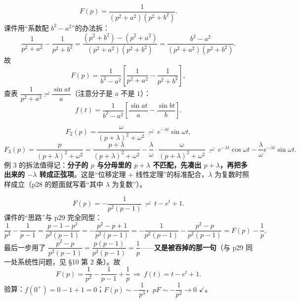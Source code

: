 \documentclass[11pt]{ctexart}
\begin{document}

\[ F(p)=\frac{1}{(p^{2}+a^{2})(p^{2}+b^{2})} .\]
课件用“系数配 $b^{2}-a^{2}$”的办法拆：
\[
\frac{1}{p^{2}+a^{2}}-\frac{1}{p^{2}+b^{2}}
=\frac{(p^{2}+b^{2})-(p^{2}+a^{2})}{(p^{2}+a^{2})(p^{2}+b^{2})}
=\frac{b^{2}-a^{2}}{(p^{2}+a^{2})(p^{2}+b^{2})} .
\]
故
\[ F(p)=\frac{1}{b^{2}-a^{2}}\left[\frac{1}{p^{2}+a^{2}}-\frac{1}{p^{2}+b^{2}}\right],\]
查表 $\dfrac{1}{p^{2}+a^{2}}\risingdotseq\dfrac{\sin at}{a}$（注意分子是 $a$ 不是 $1$）：
\[ f(t)=\frac{1}{b^{2}-a^{2}}\left[\frac{\sin at}{a}-\frac{\sin bt}{b}\right] .\]



\[ F_2(p)=\frac{\omega}{(p+\lambda)^{2}+\omega^{2}}\ \risingdotseq\ e^{-\lambda t}\sin\omega t ,\]
\[ F_3(p)=\frac{p}{(p+\lambda)^{2}+\omega^{2}}
=\frac{p+\lambda}{(p+\lambda)^{2}+\omega^{2}}-\frac{\lambda}{\omega}\cdot\frac{\omega}{(p+\lambda)^{2}+\omega^{2}}
\ \risingdotseq\ e^{-\lambda t}\cos\omega t-\frac{\lambda}{\omega}e^{-\lambda t}\sin\omega t .\]
例 3 的拆法值得记：\textbf{分子的 $p$ 与分母里的 $p+\lambda$ 不匹配，先凑出 $p+\lambda$，再把多出来的 $-\lambda$ 转成正弦项}。这是“位移定理 + 线性定理”的标准配合，$\lambda$ 为复数时照样成立（p28 的题面就写着“其中 $\lambda$ 为复数”）。


\[ F(p)=-\frac{1}{p^{2}(p-1)}\ \risingdotseq\ t-e^{t}+1 .\]
课件的“思路”与 p29 完全同型：
\[
\frac{1}{p^{2}}-\frac{1}{p-1}=\frac{p-1-p^{2}}{p^{2}(p-1)}
=-\frac{p^{2}-p+1}{p^{2}(p-1)}
=-\frac{1}{p^{2}(p-1)}-\frac{p^{2}-p}{p^{2}(p-1)}
=F(p)-\frac{1}{p} ,
\]
最后一步用了 $\dfrac{p^{2}-p}{p^{2}(p-1)}=\dfrac{p(p-1)}{p^{2}(p-1)}=\dfrac{1}{p}$——\textbf{又是被吞掉的那一句}（与 p29 同一处系统性问题，见 §10 第 2 条）。故
\[ F(p)=\frac{1}{p^{2}}-\frac{1}{p-1}+\frac{1}{p}\ \Longrightarrow\ f(t)=t-e^{t}+1 .\]
验算：$f(0^{+})=0-1+1=0$；$F(p)\sim-\dfrac{1}{p^{3}}$，$pF\sim-\dfrac{1}{p^{2}}\to0$ $\checkmark$。

\end{document}
